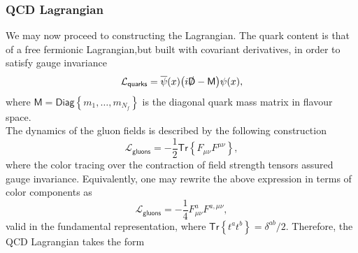 \subsubsection*{{\sffamily QCD} Lagrangian} 
We may now proceed to constructing the Lagrangian. The quark content is that of a free fermionic Lagrangian,but built with covariant derivatives, in order to satisfy gauge invariance
\begin{equation}\label{qcd1}
    \mathcal{L}_{\textsf{quarks}}=\overline{\psi}(x)\big(i\slashed{\textsf{D}}-\textsf{M}\big)\psi(x),
\end{equation}
where $\textsf{M}=\textsf{Diag}\left\{m_1,\ldots,m_{N_f}\right\}$ is the diagonal quark mass matrix in flavour space. \\
The dynamics of the gluon fields is described by the following construction
\begin{equation}\label{qcd12}
    \mathcal{L}_{\textsf{gluons}}=-\frac{1}{2}\textsf{Tr}\left\{F_{\mu\nu}F^{\mu\nu}\right\},
\end{equation}
where the color tracing over the contraction of field strength tensors assured gauge invariance. Equivalently, one may rewrite the above expression in terms of color components as
\begin{equation}\label{qcd3}
    \mathcal{L}_{\textsf{gluons}}=-\frac{1}{4}F_{\mu\nu}^aF^{a,\mu\nu},
\end{equation}
valid in the fundamental representation, where $\textsf{Tr}\left\{t^at^b\right\}=\delta^{ab}/2$. Therefore, the {\sffamily QCD} Lagrangian takes the form

